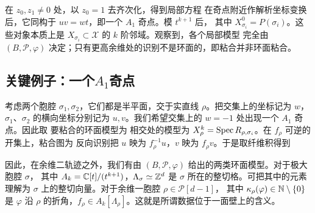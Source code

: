 在 $z_0,z_1\ne0$ 处，以 $z_0=1$ 去齐次化，得到局部方程
在奇点附近作解析坐标变换后，它同构于 $uv=wt$，即一个 $A_1$ 奇点。模 $t^{k+1}$ 后，
其中 $X_{\sigma_i}^0=P(\sigma_i)$。这些对象本质上是 $X_{\sigma_i}\subset\mathcal X$ 的 $k$ 阶邻域。观察到，各个局部模型
完全由 $(B,\mathscr P,\varphi)$ 决定；只有更高余维处的识别不是环面的，即粘合并非环面粘合。
\subsection{关键例子：一个\texorpdfstring{$A_1$}{A₁}奇点}
考虑两个胞腔 $\sigma_1,\sigma_2$，它们都是半平面，交于实直线 $\rho$。把交集上的坐标记为 $w$，$\sigma_1$、$\sigma_2$ 的横向坐标分别记为 $u,v$。我们希望交集上的 $w=-1$ 处出现一个 $A_1$ 奇点。因此取
要粘合的环面模型为
相交处的模型为 $X_\rho^k=\operatorname{Spec} R_{\rho,\sigma_i}$。在 $f_\rho$ 可逆的开集上，粘合图为
反向识别把 $u$ 映为 $f_\rho^{-1}u$，$v$ 映为 $f_\rho v$。于是取纤维积得到

因此，在余维二轨迹之外，我们有由 $(B,\mathscr P,\varphi)$ 给出的两类环面模型。对于极大胞腔 $\sigma$，
其中 $A_k=\mathbb C[t]/(t^{k+1})$，$\Lambda_\sigma\simeq\mathbb Z^d$ 是 $\sigma$ 所在的整切格。可把其中的元素理解为 $\sigma$ 上的整切向量。对于余维一胞腔 $\rho\in\mathscr P[d-1]$，
其中 $\kappa_\rho(\varphi)\in\mathbb N\setminus\{0\}$ 是 $\varphi$ 沿 $\rho$ 的折角，$f_\rho\in A_k[\Lambda_\rho]$。这就是所谓数据位于一面壁上的含义。
